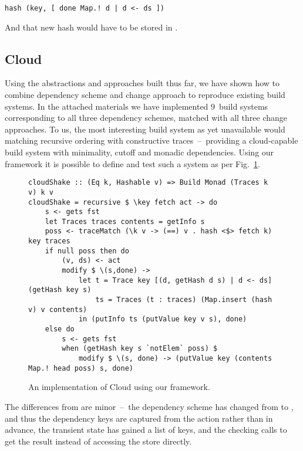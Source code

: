 \begin{verbatim}
hash (key, [ done Map.! d | d <- ds ])
\end{verbatim}

\noindent
And that new hash would have to be stored in .

\subsection{Cloud \Shake}\label{sec-implementation-cloud-shake}

Using the abstractions and approaches built thus far, we have shown how to combine dependency scheme and change approach to reproduce existing build systems. In the attached materials we have implemented 9~build systems corresponding to all three dependency schemes, matched with all three change approaches. To us, the most interesting build system as yet unavailable would matching recursive ordering with constructive traces~--~providing a cloud-capable build system with minimality, cutoff and monadic dependencies. Using our framework it is possible to define and test such a system as per Fig.~\ref{fig-cloudshake-implementation}.

\begin{figure}
\begin{verbatim}
cloudShake :: (Eq k, Hashable v) => Build Monad (Traces k v) k v
cloudShake = recursive $ \key fetch act -> do
    s <- gets fst
    let Traces traces contents = getInfo s
    poss <- traceMatch (\k v -> (==) v . hash <$> fetch k) key traces
    if null poss then do
        (v, ds) <- act
        modify $ \(s,done) ->
            let t = Trace key [(d, getHash d s) | d <- ds] (getHash key s)
                ts = Traces (t : traces) (Map.insert (hash v) v contents)
            in (putInfo ts (putValue key v s), done)
    else do
        s <- gets fst
        when (getHash key s `notElem` poss) $
            modify $ \(s, done) -> (putValue key (contents Map.! head poss) s, done)
\end{verbatim}
\vspace{-2mm}
\caption{An implementation of Cloud \Shake using our framework.}\label{fig-cloudshake-implementation}
\vspace{-2mm}
\end{figure}

The differences from  are minor~--~the dependency scheme has changed
from  to , and thus the dependency keys 
are captured from the action rather than in advance, the transient state has
gained a list of keys, and the checking calls  to get the result
instead of accessing the store directly.

